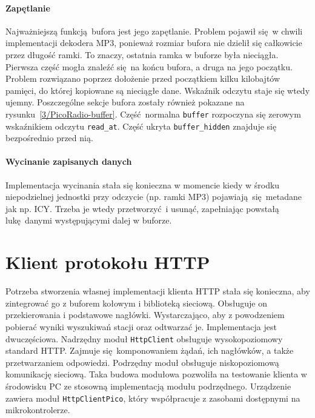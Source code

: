 \documentclass[12pt]{report}
\begin{document}
		\paragraph{Zapętlanie}
			Najważniejszą funkcją bufora jest jego zapętlanie. Problem pojawił się w chwili implementacji dekodera MP3, ponieważ rozmiar bufora nie dzielił się całkowicie przez długość ramki. To znaczy, ostatnia ramka w buforze była nieciągła. Pierwsza część mogła znaleźć się na końcu bufora, a druga na jego początku. Problem rozwiązano poprzez dołożenie przed początkiem kilku kilobajtów pamięci, do której kopiowane są nieciągłe dane. Wskaźnik odczytu staje się wtedy ujemny. Poszczególne sekcje bufora zostały również pokazane na rysunku~\ref{3/PicoRadio-buffer}. Część normalna \lstinline|buffer| rozpoczyna się zerowym wskaźnikiem odczytu \lstinline|read_at|. Część ukryta \lstinline|buffer_hidden| znajduje się bezpośrednio przed nią.
		
		\paragraph{Wycinanie zapisanych danych}
			Implementacja wycinania stała się konieczna w momencie kiedy w środku niepodzielnej jednostki przy odczycie (np. ramki MP3) pojawiają się metadane jak np. ICY. Trzeba je wtedy przetworzyć i usunąć, zapełniając powstałą lukę danymi występującymi dalej w buforze.
	
	\section{Klient protokołu HTTP}
		Potrzeba stworzenia własnej implementacji klienta HTTP stała się konieczna, aby zintegrować go z buforem kołowym i biblioteką sieciową. Obsługuje on przekierowania i podstawowe nagłówki. Wystarczająco, aby z powodzeniem pobierać wyniki wyszukiwań stacji oraz odtwarzać je. Implementacja jest dwuczęściowa. Nadrzędny moduł \lstinline|HttpClient| obsługuje wysokopoziomowy standard HTTP. Zajmuje się komponowaniem żądań, ich nagłówków, a także przetwarzaniem odpowiedzi. Podrzędny moduł obsługuje niskopoziomową komunikację sieciową. Taka budowa modułowa pozwoliła na testowanie klienta w środowisku PC ze stosowną implementacją modułu podrzędnego. Urządzenie zawiera moduł \lstinline|HttpClientPico|, który współpracuje z zasobami dostępnymi na mikrokontrolerze.
		$ $\\
		
\end{document}
